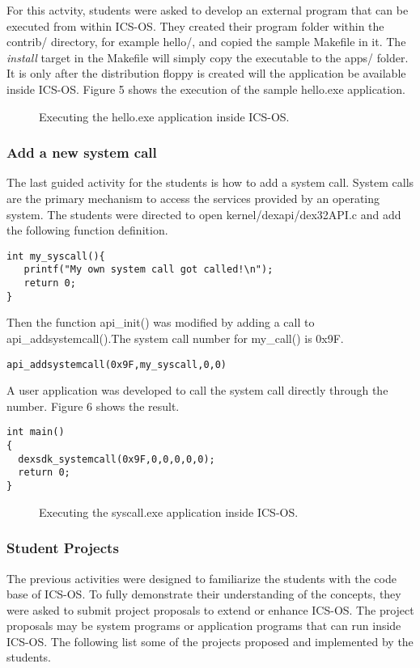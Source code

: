\documentclass{acm_proc_article-sp}
\begin{document}
For this actvity, students were asked to develop an external program that can 
be executed from within ICS-OS. They created their program folder within
the contrib/ directory, for example hello/, and copied the sample Makefile in 
it. The \textit{install} target in the Makefile will simply copy the 
executable to the apps/ folder. It is only after the distribution floppy
is created will the application be available inside ICS-OS. 
Figure 5 shows the execution of the sample hello.exe application.

\begin{figure}
\centering
{}
\caption{Executing the hello.exe application inside ICS-OS.}
\end{figure}
 

\subsubsection{Add a new system call}
The last guided activity for the students is how to add a system call.
System calls are the primary mechanism to access the services provided 
by an operating system. The students were directed to open 
kernel/dexapi/dex32API.c and add the following function definition.

\begin{verbatim}
int my_syscall(){
   printf("My own system call got called!\n");
   return 0;
}
\end{verbatim}

Then the function api\_init() was modified by adding a call to 
api\_addsystemcall().The system call number for my\_call() is 0x9F.
\begin{verbatim}
api_addsystemcall(0x9F,my_syscall,0,0)
\end{verbatim}

A user application was developed to call the system call directly through 
the number. Figure 6 shows the result.

\begin{verbatim}
int main()
{
  dexsdk_systemcall(0x9F,0,0,0,0,0);
  return 0;
}
\end{verbatim}

\begin{figure}
\centering
{}
\caption{Executing the syscall.exe application inside ICS-OS.}
\end{figure}

\subsubsection{Student Projects}
The previous activities were designed to familiarize the students with
the code base of ICS-OS. To fully demonstrate their understanding of the 
concepts, they were asked to submit project proposals to extend or enhance
ICS-OS. The project proposals may be system programs or application programs
that can run inside ICS-OS. The following list some of the projects proposed
and implemented by the students.
\end{document}
